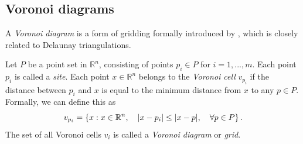 \subsection{Voronoi diagrams}
A \emph{Voronoi diagram} is a form of gridding formally introduced by \textcite{VoronoiNouvellesAD}, which is closely related to Delaunay triangulations. 

\begin{definition}
\label{def:voronoi}
Let $P$ be a point set in $\mathbb{R}^n$, consisting of points $p_i \in P$ for $i = 1, ..., m$. Each point $p_i$ is called a \emph{site}. Each point $x \in \mathbb{R}^n$ belongs to the \emph{Voronoi cell} $v_{p_i}$ if the distance between $p_i$ and $x$ is equal to the minimum distance from $x$ to any $p \in P$. Formally, we can define this as
\begin{equation}
    v_{p_i} = \left\{ x : x \in \mathbb{R}^n,\quad \lvert x - p_i\rvert \leq \lvert x - p\rvert,\quad \forall p \in P \right\}.
\end{equation}
The set of all Voronoi cells $v_i$ is called a \emph{Voronoi diagram} or \emph{grid}.
\end{definition}

